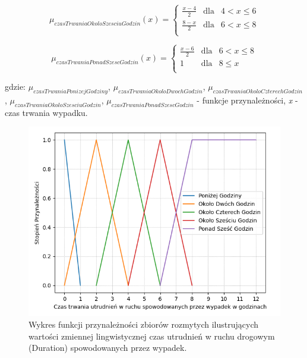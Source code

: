 \documentclass{classrep}
\begin{document}
\begin{equation}
\mu _{czasTrwaniaOkoloSzesciuGodzin}(x) =  \left\{ \begin{array}{rcl}
\frac{x - 4}{2} & \mbox{dla} & 4 < x \leq 6\\
\frac{8 - x}{2} & \mbox{dla} & 6 < x \leq 8\\
\end{array}\right.
\end{equation}

\begin{equation}
\mu _{czasTrwaniaPonadSzescGodzin}(x) =  \left\{ \begin{array}{rcl}
\frac{x - 6}{2} & \mbox{dla} & 6 < x \leq 8\\
 1 & \mbox{dla} & 8 \leq  x \\
\end{array}\right.
\end{equation}

gdzie: \(\mu _{czasTrwaniaPonizejGodziny}\), \(\mu _{czasTrwaniaOkoloDwochGodzin}\), \(\mu _{czasTrwaniaOkoloCzterechGodzin}\), \(\mu _{czasTrwaniaOkoloSzesciuGodzin}\), \(\mu _{czasTrwaniaPonadSzescGodzin}\) - funkcje przynależności, \textit{x} - czas trwania wypadku. 
\begin{figure}[h!]
 \centering
 \includegraphics[width=14cm]{FunkcjaPrzynaleznosciCzasTrwania.png}
 \vspace{-0.3cm}
 \caption{Wykres funkcji przynależności zbiorów rozmytych ilustrujących wartości zmiennej lingwistycznej czas utrudnień w ruchu drogowym (Duration) spowodowanych przez wypadek. }
 \label{rysunek do eksperymentu 1 wariantu 1}
\end{figure}
\newpage
\end{document}
